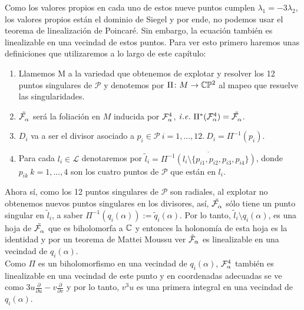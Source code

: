 Como los valores propios en cada uno de estos nueve puntos cumplen $\lambda_{1} = -3\lambda_{2}$, los valores propios están el dominio de Siegel y por ende, no podemos usar el teorema de linealización de Poincaré. Sin embargo, la ecuación también es linealizable en una vecindad de estos puntos. Para ver esto primero haremos unas definiciones que utilizaremos a lo largo de este capítulo:

\begin{Not}
\label{Notimp}
\begin{enumerate}

\*

\item Llamemos M a la variedad que obtenemos de explotar y resolver los 12 puntos singulares de $\mathcal{P}$ y denotemos por $\Pi\colon M \rightarrow \CP$ al mapeo que resuelve las singularidades.

\item $\tilde{\Fol{\alpha}}$ será la foliación en $M$ inducida por $\Fol[4]{\alpha}$,  $\mathit{i.e.} \ \Pi^{*}(\Fol[4]{\alpha}) = \tilde{\Fol{\alpha}}$.

\item $D_{i}$ va a ser el divisor asociado a $p_{i} \in \mathcal{P} \ i=1,...,12. \ D_{i} = \Pi^{-1}(p_{i})$.

\item Para cada $l_{i} \in \mathcal{L}$ denotaremos por $\tilde{l}_{i} = \overline{\Pi^{-1}(l_{i} \setminus \{p_{i1}, p_{i2}, p_{i3}, p_{i4} \})}$, donde $p_{ik} \ k=1,...,4$ son los cuatro puntos de $\mathcal{P}$ que están en $l_{i}$.

\end{enumerate}
\end{Not}
Ahora sí, como los 12 puntos singulares de $\mathcal{P}$ son radiales, al explotar no obtenemos nuevos puntos singulares en los divisores, así, $\tilde{\Fol{\alpha}}$ sólo tiene un punto singular en $\tilde{l}_{i}$, a saber $\Pi^{-1}(q_{i}(\alpha)) := \tilde{q}_{i}(\alpha)$. Por lo tanto, $\tilde{l}_{i}\setminus q_{i}(\alpha)$, es una hoja de $\tilde{\Fol{\alpha}}$ que es biholomorfa a $\C$ y entonces la holonomía de esta hoja es la identidad y por un teorema de Mattei Moussu ver \cite[teorema, 2 p.~482]{Mattei-Moussu} $\tilde{\Foli}_{\alpha}$ es linealizable en una vecindad de $q_{i}(\alpha)$.
\\

Como $\Pi$ es un biholomorfismo en una vecindad de $q_{i}(\alpha)$, $\Fol[4]{\alpha}$ también es linealizable en una vecindad de este punto y en coordenadas adecuadas se ve como $3u\frac{\partial}{\partial u} - v\frac{\partial}{\partial v}$ y por lo tanto, $v^{3}u$ es una primera integral en una vecindad de $q_{i}(\alpha)$.
\\


